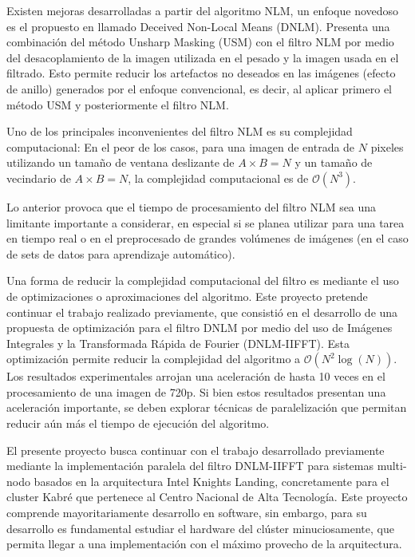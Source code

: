 Existen mejoras desarrolladas a partir del algoritmo NLM, un enfoque novedoso es el propuesto en \textcite{7160148} llamado Deceived Non-Local Means (DNLM). Presenta una combinaci\'on del m\'etodo Unsharp Masking (USM) con el filtro NLM por medio del desacoplamiento de la imagen utilizada en el pesado y la imagen usada en el filtrado. Esto permite reducir los artefactos no deseados en las im\'agenes (efecto de anillo) generados por el enfoque convencional, es decir, al aplicar primero el m\'etodo USM y posteriormente el filtro NLM.  

Uno de los principales inconvenientes del filtro NLM es su complejidad computacional: En el peor de los casos, para una imagen de entrada de $N$ pixeles utilizando un tamaño de ventana deslizante de $A\times B = N$ y un tamaño de vecindario de $A\times B = N$, la complejidad computacional es de $\mathcal{O}(N^{3})$. 

Lo anterior provoca que el tiempo de procesamiento del filtro NLM sea una limitante importante a considerar, en especial si se planea utilizar para una tarea en tiempo real o en el preprocesado de grandes vol\'umenes de im\'agenes (en el caso de sets de datos para aprendizaje autom\'atico). 

Una forma de reducir la complejidad computacional del filtro es mediante el uso de optimizaciones o aproximaciones del algoritmo. Este proyecto pretende continuar el trabajo realizado previamente, que consisti\'o en el desarrollo de una propuesta de optimizaci\'on para el filtro DNLM por medio del uso de Im\'agenes Integrales y la Transformada R\'apida de Fourier (DNLM-IIFFT). Esta optimizaci\'on permite reducir la complejidad del algoritmo a  $\mathcal{O}(N^{2}\log(N))$. Los resultados experimentales arrojan una aceleraci\'on de hasta 10 veces en el procesamiento de una imagen de 720p. Si bien estos resultados presentan una aceleraci\'on importante, se deben explorar t\'ecnicas de paralelizaci\'on que permitan reducir a\'un m\'as el tiempo de ejecuci\'on del algoritmo. 

El presente proyecto busca continuar con el trabajo desarrollado previamente mediante la implementaci\'on paralela del filtro DNLM-IIFFT para sistemas multi-nodo basados en la arquitectura Intel Knights Landing, concretamente para el cluster Kabr\'e que pertenece al Centro Nacional de Alta Tecnolog\'ia. Este proyecto comprende mayoritariamente desarrollo en software, sin embargo, para su desarrollo es fundamental estudiar el hardware del cl\'uster minuciosamente, que permita llegar a una implementaci\'on con el m\'aximo provecho de la arquitectura. 


